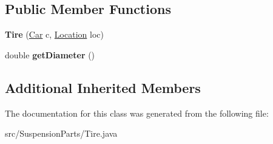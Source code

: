 \subsection*{Public Member Functions}
\begin{DoxyCompactItemize}
\item 
\hypertarget{classSuspensionParts_1_1Tire_ab08ad9af8c909f4e4dad4c5e9e37bed9}{}{\bfseries Tire} (\hyperlink{classCars_1_1Car}{Car} c, \hyperlink{enumEnums_1_1Location}{Location} loc)\label{classSuspensionParts_1_1Tire_ab08ad9af8c909f4e4dad4c5e9e37bed9}

\item 
\hypertarget{classSuspensionParts_1_1Tire_a54efdf3388766984f75268c94d50767a}{}double {\bfseries get\+Diameter} ()\label{classSuspensionParts_1_1Tire_a54efdf3388766984f75268c94d50767a}

\end{DoxyCompactItemize}
\subsection*{Additional Inherited Members}


The documentation for this class was generated from the following file\+:\begin{DoxyCompactItemize}
\item 
src/\+Suspension\+Parts/Tire.\+java\end{DoxyCompactItemize}
